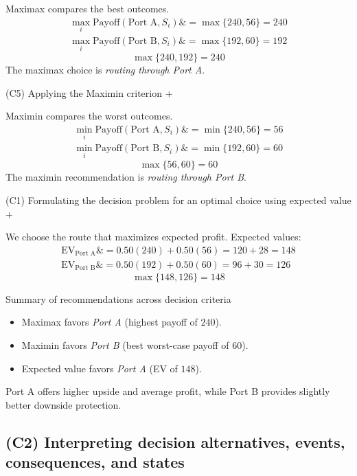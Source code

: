 \documentclass[11pt]{article}
\begin{document}
	
	Maximax compares the best outcomes.
	\[
	\begin{aligned}
		\max_i \text{Payoff}(\text{Port A}, S_i) \&= \max\{240, 56\} = 240 \\
		\max_i \text{Payoff}(\text{Port B}, S_i) \&= \max\{192, 60\} = 192
	\end{aligned}
	\]
	\[
	\max\{240, 192\} = 240
	\]
	The maximax choice is \emph{routing through Port A}.
	
	
	
	
	
	(C5) Applying the Maximin criterion
	+
	
	
	Maximin compares the worst outcomes.
	\[
	\begin{aligned}
		\min_i \text{Payoff}(\text{Port A}, S_i) \&= \min\{240, 56\} = 56 \\
		\min_i \text{Payoff}(\text{Port B}, S_i) \&= \min\{192, 60\} = 60
	\end{aligned}
	\]
	\[
	\max\{56, 60\} = 60
	\]
	The maximin recommendation is \emph{routing through Port B}.
	
	
	
	
	
	(C1) Formulating the decision problem for an optimal choice using expected value
	+
	
	
	We choose the route that maximizes expected profit. Expected values:
	\[
	\begin{aligned}
		\mathrm{EV}_{\text{Port A}} \&= 0.50(240) + 0.50(56) = 120 + 28 = 148 \\
		\mathrm{EV}_{\text{Port B}} \&= 0.50(192) + 0.50(60) = 96 + 30 = 126
	\end{aligned}
	\]
	\[
	\max\{148, 126\} = 148
	\]
	
	Summary of recommendations across decision criteria
	\begin{itemize}
		\item Maximax favors \emph{Port A} (highest payoff of $240$).
		\item Maximin favors \emph{Port B} (best worst-case payoff of $60$).
		\item Expected value favors \emph{Port A} (EV of $148$).
	\end{itemize}
	
	
	Port A offers higher upside and average profit, while Port B provides slightly better downside protection.
	
	\subsection*{(C2) Interpreting decision alternatives, events, consequences, and states}
	
\end{document}
